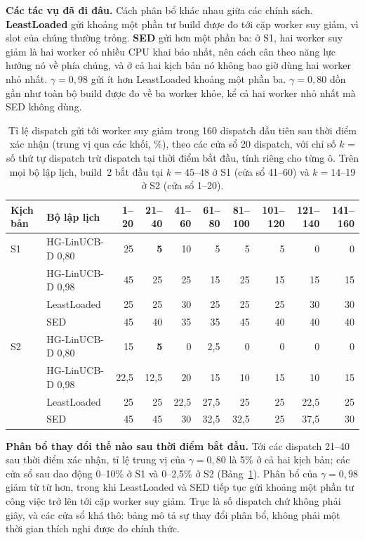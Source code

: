 \documentclass[final,5p,times,twocolumn]{elsarticle}
\begin{document}
\textbf{Các tác vụ đã đi đâu.} Cách phân bổ khác nhau giữa các chính sách. \textbf{LeastLoaded} gửi khoảng một phần tư build được đo tới cặp worker suy giảm, vì slot của chúng thường trống. \textbf{SED} gửi hơn một phần ba: ở S1, hai worker suy giảm là hai worker có nhiều CPU khai báo nhất, nên cách cân theo năng lực hướng nó về phía chúng, và ở cả hai kịch bản nó không bao giờ dùng hai worker nhỏ nhất. \textbf{$\gamma=0{,}98$} gửi ít hơn LeastLoaded khoảng một phần ba. \textbf{$\gamma=0{,}80$} dồn gần như toàn bộ build được đo về ba worker khỏe, kể cả hai worker nhỏ nhất mà SED không dùng.

\begin{table}[t]
\centering
\caption{Tỉ lệ dispatch gửi tới worker suy giảm trong 160 dispatch đầu tiên sau thời điểm xác nhận (trung vị qua các khối, \%), theo các cửa sổ 20 dispatch, với chỉ số $k$ = số thứ tự dispatch trừ dispatch tại thời điểm bắt đầu, tính riêng cho từng ô. Trên mọi bộ lập lịch, build~2 bắt đầu tại $k=45$--48 ở S1 (cửa sổ 41--60) và $k=14$--19 ở S2 (cửa sổ 1--20).}
\label{tab:timeline}
\footnotesize
\begin{tabular}{llrrrrrrrr}
\toprule
Kịch bản & Bộ lập lịch & 1--20 & 21--40 & 41--60 & 61--80 & 81--100 & 101--120 & 121--140 & 141--160 \\
\midrule
S1 & HG-LinUCB-D 0,80 & 25 & \textbf{5} & 10 & 5 & 5 & 5 & 0 & 0 \\
 & HG-LinUCB-D 0,98 & 45 & 25 & 25 & 15 & 25 & 15 & 15 & 15 \\
 & LeastLoaded & 25 & 25 & 30 & 25 & 25 & 25 & 30 & 30 \\
 & SED & 45 & 40 & 35 & 35 & 45 & 40 & 40 & 40 \\
\midrule
S2 & HG-LinUCB-D 0,80 & 15 & \textbf{5} & 0 & 2,5 & 0 & 0 & 0 & 0 \\
 & HG-LinUCB-D 0,98 & 22,5 & 12,5 & 20 & 15 & 10 & 15 & 10 & 15 \\
 & LeastLoaded & 25 & 25 & 22,5 & 27,5 & 25 & 25 & 22,5 & 25 \\
 & SED & 45 & 45 & 30 & 32,5 & 32,5 & 25 & 37,5 & 30 \\
\bottomrule
\end{tabular}
\end{table}

\textbf{Phân bổ thay đổi thế nào sau thời điểm bắt đầu.} Tới các dispatch 21--40 sau thời điểm xác nhận, tỉ lệ trung vị của $\gamma=0{,}80$ là 5\% ở cả hai kịch bản; các cửa sổ sau dao động 0--10\% ở S1 và 0--2,5\% ở S2 (Bảng~\ref{tab:timeline}). Phân bổ của $\gamma=0{,}98$ giảm từ từ hơn, trong khi LeastLoaded và SED tiếp tục gửi khoảng một phần tư công việc trở lên tới cặp worker suy giảm. Trục là số dispatch chứ không phải giây, và các cửa sổ khá thô: bảng mô tả sự thay đổi phân bổ, không phải một thời gian thích nghi được đo chính thức.
\end{document}
